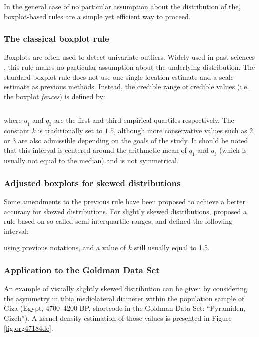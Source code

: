 \documentclass[review, 3p]{elsarticle}
\begin{document}
In the general case of no particular assumption about the distribution of the, boxplot-based rules are a simple yet efficient way to proceed.

\subsubsection{The classical boxplot rule}
\label{sec:orgf7c5259}
Boxplots \citep{tukey1977_ExploratoryDataAnalysis} are often used to detect univariate outliers. Widely used in past sciences \citep[e.g.,][]{pickard2017_IsotopicEvidenceDietary}, this rule makes no particular assumption about the underlying distribution. The standard boxplot rule does not use one single location estimate and a scale estimate as previous methods. Instead, the credible range of credible values (i.e., the boxplot \emph{fences}) is defined by:

\begin{equation}
[q_1 - k \cdot IQR \, ; \, q_3 + k \cdot IQR] \label{eq:boxplot}
\end{equation}

where \(q_1\) and \(q_3\) are the first and third empirical quartiles respectively. The constant \(k\) is traditionally set to \(1.5\), although more conservative values such as 2 or 3 are also admissible depending on the goals of the study. It should be noted that this interval is centered around the arithmetic mean of \(q_1\) and \(q_3\) (which is usually not equal to the median) and is not symmetrical.

\subsubsection{Adjusted boxplots for skewed distributions}
\label{sec:org817fcdc}
Some amendments to the previous rule have been proposed to achieve a better accuracy for skewed distributions. For slightly skewed distributions, \cite{kimber1990_ExploratoryDataAnalysis} proposed a rule based on so-called semi-interquartile ranges, and defined the following interval:

\begin{equation}
[q_1 - 2k \cdot (m - q_1) \, ; \, q_3 + 2k \cdot (q_3 - m)]  \label{eq:adjusted_boxplot}
\end{equation}
using previous notations, and a value of \(k\) still usually equal to 1.5.

\subsubsection{Application to the Goldman Data Set}
\label{sec:orga8d2337}
An example of visually slightly skewed distribution can be given by considering the asymmetry in tibia mediolateral diameter within the population sample of Giza (Egypt, 4700--4200 BP, shortcode in the Goldman Data Set: ``Pyramiden, Gizeh''). A kernel density estimation of those values is presented in Figure \ref{fig:org47184de}.
\end{document}
